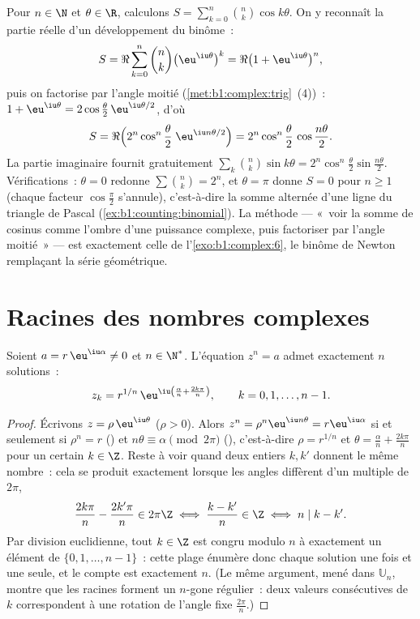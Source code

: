 \begin{example}\label{ex:b1:complex:binomsum}
Pour $n \in \N$ et $\theta \in \R$, calculons $S =
\sum_{k=0}^{n}\binom nk \cos k\theta$. On y reconnaît la partie
réelle d'un développement du binôme~:
\[
S = \Re\sum_{k=0}^n \binom nk \bigl(\eu^{\iu\theta}\bigr)^k
= \Re\bigl(1 + \eu^{\iu\theta}\bigr)^n ,
\]
puis on factorise par l'angle moitié
(\cref{met:b1:complex:trig}~(4))~: $1 + \eu^{\iu\theta} =
2\cos\frac\theta2\,\eu^{\iu\theta/2}$, d'où
\[
S = \Re\Bigl(2^n\cos^n\frac\theta2\;\eu^{\iu n\theta/2}\Bigr)
= 2^n \cos^n\frac\theta2\,\cos\frac{n\theta}2 .
\]
La partie imaginaire fournit gratuitement $\sum_k\binom nk\sin
k\theta = 2^n\cos^n\frac\theta2\sin\frac{n\theta}2$.
Vérifications~: $\theta = 0$ redonne $\sum\binom nk = 2^n$, et
$\theta = \pi$ donne $S = 0$ pour $n \geq 1$ (chaque facteur
$\cos\frac\pi2$ s'annule), c'est-à-dire la somme alternée d'une
ligne du triangle de Pascal (\cref{ex:b1:counting:binomial}). La
méthode --- «~voir la somme de cosinus comme l'ombre d'une
puissance complexe, puis factoriser par l'angle moitié~» --- est
exactement celle de l'\cref{exo:b1:complex:6}, le binôme de Newton
remplaçant la série géométrique.
\end{example}

\section{Racines des nombres complexes}

\begin{theorem}\label{thm:b1:complex:roots}
Soient $a = r\,\eu^{\iu\alpha} \neq 0$ et $n \in \N^*$. L'équation
$z^n = a$ admet exactement $n$ solutions~:
\[
z_k = r^{1/n}\, \eu^{\iu\left(\frac{\alpha}{n} +
\frac{2k\pi}{n}\right)},
\qquad k = 0, 1, \dots, n - 1 .
\]
\end{theorem}

\begin{proof}
Écrivons $z = \rho\,\eu^{\iu\theta}$ ($\rho > 0$). Alors $z^n =
\rho^n \eu^{\iu n\theta} = r \eu^{\iu\alpha}$ si et seulement si
$\rho^n = r$ () et $n\theta \equiv \alpha \pmod{2\pi}$
(), c'est-à-dire $\rho = r^{1/n}$ et $\theta =
\frac{\alpha}{n} + \frac{2k\pi}{n}$ pour un certain $k \in \Z$. Reste
à voir quand deux entiers $k, k'$ donnent le même nombre~: cela se
produit exactement lorsque les angles diffèrent d'un multiple de
$2\pi$,
\[
\frac{2k\pi}n - \frac{2k'\pi}n \in 2\pi\Z
\iff \frac{k - k'}n \in \Z
\iff n \mid k - k' .
\]
Par division euclidienne, tout $k \in \Z$ est congru modulo $n$ à
exactement un élément de $\{0, 1, \dots, n-1\}$~: cette plage énumère
donc chaque solution une fois et une seule, et le compte est
exactement $n$. (Le même argument, mené dans $\mathbb U_n$, montre que
les racines forment un $n$-gone régulier~: deux valeurs consécutives
de $k$ correspondent à une rotation de l'angle fixe $\frac{2\pi}n$.)
\end{proof}

